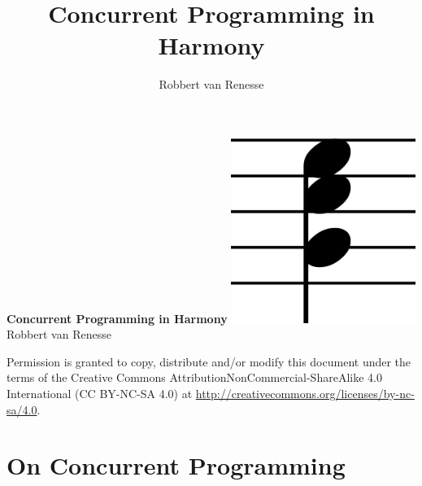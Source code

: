 \documentclass{report}
\title{Concurrent Programming in Harmony}
\author{Robbert van Renesse}
\begin{document}
\begin{titlepage}
    \centering
    \vfill
    {\bfseries\huge
        Concurrent Programming in Harmony
    }
    \vfill
    \includegraphics[width=6cm]{figures/harmony-icon.png}
    \vfill
    \vfill
    \hfill \Large Robbert van Renesse
\end{titlepage}

Permission is granted to copy, distribute and/or modify this
document under the terms of the
Creative Commons AttributionNonCommercial-ShareAlike 4.0 International
(CC BY-NC-SA 4.0) at
\url{http://creativecommons.org/licenses/by-nc-sa/4.0}.

\tableofcontents

\chapter{On Concurrent Programming}
\end{document}
